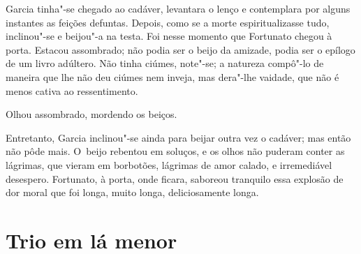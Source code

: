 \begin{linenumbers}
Garcia tinha"-se chegado ao cadáver, levantara o lenço e contemplara por
alguns instantes as feições defuntas. Depois, como se a morte
espiritualizasse tudo, inclinou"-se e beijou"-a na testa. Foi nesse
momento que Fortunato chegou à porta. Estacou assombrado; não podia ser
o beijo da amizade, podia ser o epílogo de um livro adúltero. Não tinha
ciúmes, note"-se; a natureza compô"-lo de maneira que lhe não deu ciúmes
nem inveja, mas dera"-lhe vaidade, que não é menos cativa ao
ressentimento.

Olhou assombrado, mordendo os beiços.

Entretanto, Garcia inclinou"-se ainda para beijar outra vez o cadáver;
mas então não pôde mais. O~beijo rebentou em soluços, e os olhos não
puderam conter as lágrimas, que vieram em borbotões, lágrimas de amor
calado, e irremediável desespero. Fortunato, à porta, onde ficara,
saboreou tranquilo essa explosão de dor moral que foi longa, muito
longa, deliciosamente longa.

\end{linenumbers}

\chapter{Trio em lá menor}


